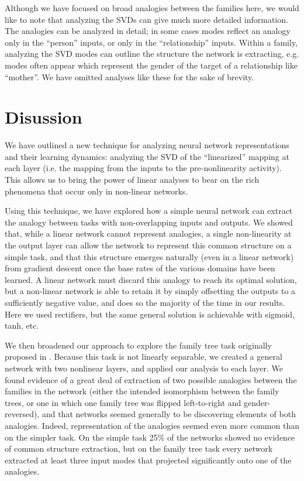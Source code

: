 \documentclass[10pt,letterpaper]{article}
\begin{document}
Although we have focused on broad analogies between the families here, we would like to note that analyzing the SVDs can give much more detailed information. The analogies can be analyzed in detail; in some cases modes reflect an analogy only in the ``person'' inputs, or only in the ``relationship'' inputs. Within a family, analyzing the SVD modes can outline the structure the network is extracting, e.g. modes often appear which represent the gender of the target of a relationship like ``mother''. We have omitted analyses like these for the sake of brevity. \par 
\section{Disussion}
We have outlined a new technique for analyzing neural network representations and their learning dynamics: analyzing the SVD of the ``linearized'' mapping at each layer (i.e. the mapping from the inputs to the pre-nonlinearity activity). This allows us to bring the power of linear analyses to bear on the rich phenomena that occur only in non-linear networks.\par
Using this technique, we have explored how a simple neural network can extract the analogy between tasks with non-overlapping inputs and outputs. We showed that, while a linear network cannot represent analogies, a single non-linearity at the output layer can allow the network to represent this common structure on a simple task, and that this structure emerges naturally (even in a linear network) from gradient descent once the base rates of the various domains have been learned. A linear network must discard this analogy to reach its optimal solution, but a non-linear network is able to retain it by simply offsetting the outputs to a sufficiently negative value, and does so the majority of the time in our results. Here we used rectifiers, but the same general solution is achievable with sigmoid, tanh, etc. \par 
We then broadened our approach to explore the family tree task originally proposed in \citet{Hinton1986}. Because this task is not linearly separable, we created a general network with two nonlinear layers, and applied our analysis to each layer. We found evidence of a great deal of extraction of two possible analogies between the families in the network (either the intended isomorphism between the family trees, or one in which one family tree was flipped left-to-right and gender-reversed), and that networks seemed generally to be discovering elements of both analogies. Indeed, representation of the analogies seemed even more common than on the simpler task. On the simple task 25\% of the networks showed no evidence of common structure extraction, but on the family tree task every network extracted at least three input modes that projected significantly onto one of the analogies. \par 
\end{document}

